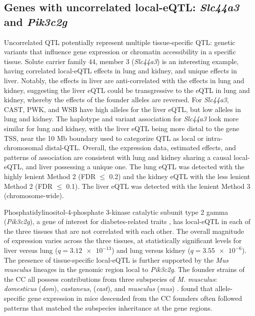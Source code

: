 \subsection{Genes with uncorrelated local-eQTL: \textit{Slc44a3} and \textit{Pik3c2g}}

Uncorrelated QTL potentially represent multiple tissue-specific QTL: genetic variants that influence gene expression or chromatin accessibility in a specific tissue. Solute carrier family 44, member 3 (\textit{Slc44a3}) is an interesting example, having correlated local-eQTL effects in lung and kidney, and unique effects in liver. Notably, the effects in liver are anti-correlated with the effects in lung and kidney, suggesting the liver eQTL could be transgressive \citep{Rieseberg1999} to the eQTL in lung and kidney, whereby the effects of the founder alleles are reversed. For \textit{Slc44a3}, CAST, PWK, and WSB have high alleles for the liver eQTL, but low alleles in lung and kidney. The haplotype and variant association for \textit{Slc44a3} look more similar for lung and kidney, with the liver eQTL being more distal to the gene TSS, near the 10 Mb boundary used to categorize QTL as local or intra-chromosomal distal-QTL. Overall, the expression data, estimated effects, and patterns of association are consistent with lung and kidney sharing a causal local-eQTL, and liver possessing a unique one. The lung eQTL was detected with the highly lenient Method 2 (FDR $\leq$ 0.2) and the kidney eQTL with the less lenient Method 2 (FDR $\leq$ 0.1). The liver eQTL was detected with the lenient Method 3 (chromosome-wide). 

Phosphatidylinositol-4-phosphate 3-kinase catalytic subunit type 2 gamma (\textit{Pik3c2g}), a gene of interest for diabetes-related traits \citep{Braccini2015}, has local-eQTL in each of the three tissues that are not correlated with each other. The overall magnitude of expression varies across the three tissues, at statistically significant levels for liver versus lung ($q = \num{3.12e-13}$) and lung versus kidney ($q = \num{3.55e-6}$). The presence of tissue-specific local-eQTL is further supported by the \textit{Mus musculus} lineages in the genomic region local to \textit{Pik3c2g}. The founder strains of the CC all possess contributions from three subspecies of \textit{M. musculus}: \textit{domesticus} (\textit{dom}), \textit{castaneus}, (\textit{cast}), and \textit{musculus} (\textit{mus}) \citep{Yang2011}. \cite{Crowley2015} found that allele-specific gene expression in mice descended from the CC founders often followed patterns that matched the subspecies inheritance at the gene regions.

